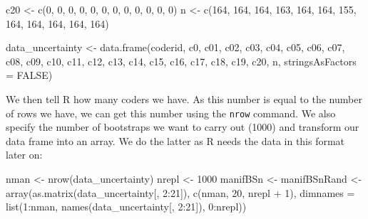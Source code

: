 \documentclass[
]{book}
\newenvironment{Shaded}{\begin{snugshade}}{\end{snugshade}}
\newcommand{\AttributeTok}[1]{\textcolor[rgb]{0.77,0.63,0.00}{#1}}
\newcommand{\ConstantTok}[1]{\textcolor[rgb]{0.00,0.00,0.00}{#1}}
\newcommand{\DecValTok}[1]{\textcolor[rgb]{0.00,0.00,0.81}{#1}}
\newcommand{\FunctionTok}[1]{\textcolor[rgb]{0.00,0.00,0.00}{#1}}
\newcommand{\NormalTok}[1]{#1}
\newcommand{\OtherTok}[1]{\textcolor[rgb]{0.56,0.35,0.01}{#1}}
\newcommand{\SpecialCharTok}[1]{\textcolor[rgb]{0.00,0.00,0.00}{#1}}
\begin{document}
\begin{Shaded}
\begin{Highlighting}[]
\NormalTok{c20 }\OtherTok{\textless{}{-}} \FunctionTok{c}\NormalTok{(}\DecValTok{0}\NormalTok{, }\DecValTok{0}\NormalTok{, }\DecValTok{0}\NormalTok{, }\DecValTok{0}\NormalTok{, }\DecValTok{0}\NormalTok{, }\DecValTok{0}\NormalTok{, }\DecValTok{0}\NormalTok{, }\DecValTok{0}\NormalTok{, }\DecValTok{0}\NormalTok{, }\DecValTok{0}\NormalTok{, }\DecValTok{0}\NormalTok{, }\DecValTok{0}\NormalTok{)}
\NormalTok{n }\OtherTok{\textless{}{-}} \FunctionTok{c}\NormalTok{(}\DecValTok{164}\NormalTok{, }\DecValTok{164}\NormalTok{, }\DecValTok{164}\NormalTok{, }\DecValTok{163}\NormalTok{, }\DecValTok{164}\NormalTok{, }\DecValTok{164}\NormalTok{, }\DecValTok{155}\NormalTok{, }\DecValTok{164}\NormalTok{, }\DecValTok{164}\NormalTok{, }\DecValTok{164}\NormalTok{, }\DecValTok{164}\NormalTok{, }
    \DecValTok{164}\NormalTok{)}

\NormalTok{data\_uncertainty }\OtherTok{\textless{}{-}} \FunctionTok{data.frame}\NormalTok{(coderid, c0, c01, c02, c03, c04, }
\NormalTok{    c05, c06, c07, c08, c09, c10, c11, c12, c13, c14, c15, c16, }
\NormalTok{    c17, c18, c19, c20, n, }\AttributeTok{stringsAsFactors =} \ConstantTok{FALSE}\NormalTok{)}
\end{Highlighting}
\end{Shaded}

We then tell R how many coders we have. As this number is equal to the number of rows we have, we can get this number using the \texttt{nrow} command. We also specify the number of bootstraps we want to carry out (1000) and transform our data frame into an array. We do the latter as R needs the data in this format later on:

\begin{Shaded}
\begin{Highlighting}[]
\NormalTok{nman }\OtherTok{\textless{}{-}} \FunctionTok{nrow}\NormalTok{(data\_uncertainty)}
\NormalTok{nrepl }\OtherTok{\textless{}{-}} \DecValTok{1000}
\NormalTok{manifBSn }\OtherTok{\textless{}{-}}\NormalTok{ manifBSnRand }\OtherTok{\textless{}{-}} \FunctionTok{array}\NormalTok{(}\FunctionTok{as.matrix}\NormalTok{(data\_uncertainty[, }
    \DecValTok{2}\SpecialCharTok{:}\DecValTok{21}\NormalTok{]), }\FunctionTok{c}\NormalTok{(nman, }\DecValTok{20}\NormalTok{, nrepl }\SpecialCharTok{+} \DecValTok{1}\NormalTok{), }\AttributeTok{dimnames =} \FunctionTok{list}\NormalTok{(}\DecValTok{1}\SpecialCharTok{:}\NormalTok{nman, }\FunctionTok{names}\NormalTok{(data\_uncertainty[, }
    \DecValTok{2}\SpecialCharTok{:}\DecValTok{21}\NormalTok{]), }\DecValTok{0}\SpecialCharTok{:}\NormalTok{nrepl))}
\end{Highlighting}
\end{Shaded}
\end{document}
